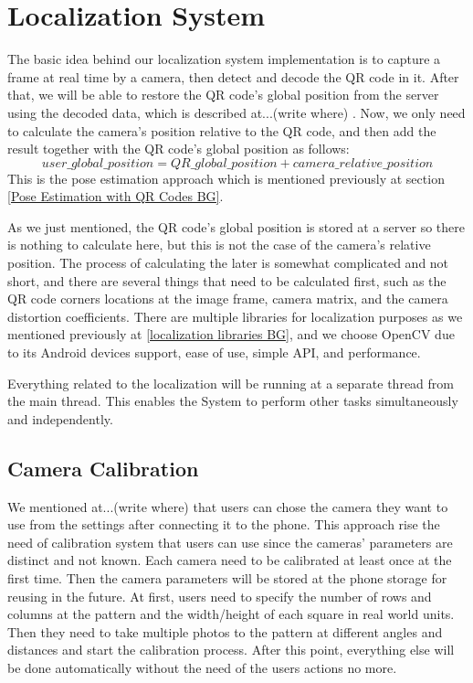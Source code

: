 \section{Localization System}
The basic idea behind our localization system implementation is to capture a frame at real time by a camera, then detect and decode the QR code in it. After that, we will be able to restore the QR code's global position from the server using the decoded data, \color{blue}which is described at...(write where) \color{black}. Now, we only need to calculate the camera's position relative to the QR code, and then add the result together with the QR code's global position as follows:
\[ user\_global\_position = QR\_global\_position +  camera\_relative\_position\]
This is the pose estimation approach which is mentioned previously at section \ref{Pose Estimation with QR Codes BG}.

As we just mentioned, the QR code's global position is stored at a server so there is nothing to calculate here, but this is not the case of the camera's relative position. The process of calculating the later is somewhat complicated and not short, and there are several things that need to be calculated first, such as the QR code corners locations at the image frame, camera matrix, and the camera distortion coefficients. There are multiple libraries for localization purposes as we mentioned previously at \ref{localization libraries BG}, and we choose OpenCV due to its Android devices support, ease of use, simple API, and performance.

Everything related to the localization will be running at a separate thread from the main thread. This enables the System to perform other tasks simultaneously and independently.

\subsection{Camera Calibration}
We mentioned \color{blue}at...(write where) \color{black} that users can chose the camera they want to use from the settings after connecting it to the phone. This approach rise the need of calibration system that users can use since the cameras' parameters are distinct and not known. Each camera need to be calibrated at least once at the first time. Then the camera parameters will be stored at the phone storage for reusing in the future. At first, users need to specify the number of rows and columns at the pattern and the width/height of each square in real world units. Then they need to take multiple photos to the pattern at different angles and distances and start the calibration process. After this point, everything else will be done automatically without the need of the users actions no more. 


